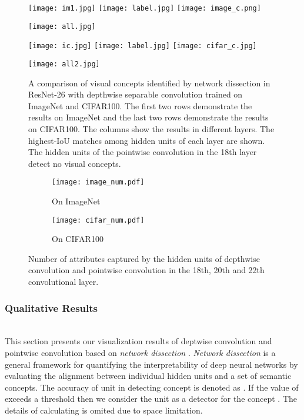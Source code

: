 \documentclass[letterpaper]{article} \usepackage{aaai19}  \usepackage{times}  \usepackage{helvet}  \usepackage{courier}  \usepackage{url}  \usepackage{graphicx}  \usepackage{amssymb}
\begin{document}
 \begin{figure*}[ht]
\centering
\texttt{[image: im1.jpg]} 
\texttt{[image: label.jpg]} 
\texttt{[image: image\_c.png]} 

\texttt{[image: all.jpg]} 


\texttt{[image: ic.jpg]} 
\texttt{[image: label.jpg]} 
\texttt{[image: cifar\_c.jpg]} 

\texttt{[image: all2.jpg]} 

\caption{A comparison of visual concepts identified by network dissection in ResNet-26 with depthwise separable convolution trained on ImageNet and CIFAR100. The first two rows demonstrate the results on ImageNet and the last two rows demonstrate the results on CIFAR100. The columns show the results in different layers. The highest-IoU matches among hidden units of each layer are shown. The hidden units of the pointwise convolution in the 18th layer detect no visual concepts. }
\label{fig:concepts}
\end{figure*}

\begin{figure}[h]
\centering
   \begin{subfigure}{0.49\linewidth} \centering
     \texttt{[image: image\_num.pdf]}
     \caption{On ImageNet}
   \end{subfigure}
   \begin{subfigure}{0.49\linewidth} \centering
     \texttt{[image: cifar\_num.pdf]}
     \caption{On CIFAR100}
   \end{subfigure}
\caption{Number of attributes captured by the hidden units of depthwise convolution and pointwise convolution in the 18th, 20th and 22th convolutional layer.}   \label{fig: concepts_num}
\end{figure}

\subsubsection{Qualitative Results} ~\\
This section presents our visualization results of deptwise convolution and pointwise convolution based on \textit{network dissection} \cite{bau2017network}. \textit{Network dissection} is a general framework for quantifying the interpretability of deep neural networks by evaluating the alignment between individual hidden units and a set of semantic concepts. The accuracy of unit 
in detecting concept  is denoted as . If the value of  exceeds a threshold then we consider the unit  as a detector for the concept . The details of calculating  is omited due to space limitation. 
\end{document}
